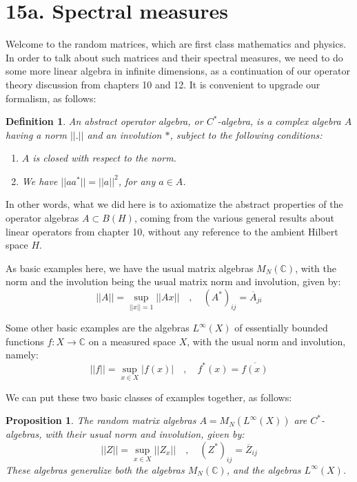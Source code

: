 \documentclass[12pt]{amsbook}
\newtheorem{definition}[theorem]{Definition}
\newtheorem{proposition}[theorem]{Proposition}
\begin{document}
\section*{15a. Spectral measures}

Welcome to the random matrices, which are first class mathematics and physics. In order to talk about such matrices and their spectral measures, we need to do some more linear algebra in infinite dimensions, as a continuation of our operator theory discussion from chapters 10 and 12. It is convenient to upgrade our formalism, as follows:


\begin{definition}
An abstract operator algebra, or $C^*$-algebra, is a complex algebra $A$ having a norm $||.||$ and an involution $*$, subject to the following conditions:
\begin{enumerate}
\item $A$ is closed with respect to the norm.

\item We have $||aa^*||=||a||^2$, for any $a\in A$.
\end{enumerate}
\end{definition}

In other words, what we did here is to axiomatize the abstract properties of the operator algebras $A\subset B(H)$, coming from the various general results about linear operators from chapter 10, without any reference to the ambient Hilbert space $H$. 

\bigskip

As basic examples here, we have the usual matrix algebras $M_N(\mathbb C)$, with the norm and the involution being the usual matrix norm and involution, given by:
$$||A||=\sup_{||x||=1}||Ax||\quad,\quad 
(A^*)_{ij}=\overline{A}_{ji}$$

Some other basic examples are the algebras $L^\infty(X)$ of essentially bounded functions $f:X\to\mathbb C$ on a measured space $X$, with the usual norm and involution, namely:
$$||f||=\sup_{x\in X}|f(x)|\quad,\quad 
f^*(x)=\overline{f(x)}$$

We can put these two basic classes of examples together, as follows:


\begin{proposition}
The random matrix algebras $A=M_N(L^\infty(X))$ are $C^*$-algebras, with their usual norm and involution, given by:
$$||Z||=\sup_{x\in X}||Z_x||\quad,\quad 
(Z^*)_{ij}=\overline{Z}_{ij}$$
These algebras generalize both the algebras $M_N(\mathbb C)$, and the algebras $L^\infty(X)$.
\end{proposition}
\end{document}
